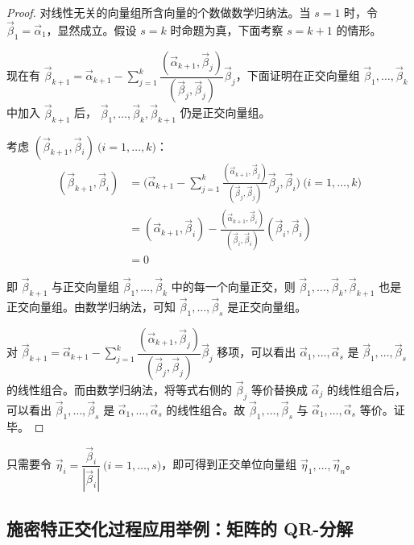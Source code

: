 \begin{proof}
	对线性无关的向量组所含向量的个数做数学归纳法。当 $s = 1$ 时，令 $\vec \beta_1 = \vec \alpha_1$，显然成立。假设 $s = k$ 时命题为真，下面考察 $s = k + 1$ 的情形。

	现在有 $\vec \beta_{k + 1} = \vec \alpha_{k + 1} - \sum\limits_{j = 1}^{k} \dfrac{(\vec \alpha_{k + 1}, \vec \beta_j)}{(\vec \beta_j, \vec \beta_j)} \vec \beta_j$，下面证明在正交向量组 $\vec \beta_1, \ldots, \vec \beta_k$ 中加入 $\vec \beta_{k + 1}$ 后， $\vec \beta_1, \ldots, \vec \beta_k, \vec \beta_{k + 1}$ 仍是正交向量组。

	考虑 $(\vec \beta_{k + 1}, \vec \beta_i) \pod{i = 1, \ldots, k}$：
	$$
	\begin{aligned}
		(\vec \beta_{k + 1}, \vec \beta_i) &= \biggl( \vec \alpha_{k + 1} - \sum\limits_{j = 1}^{k} \frac{(\vec \alpha_{k + 1}, \vec \beta_j)}{(\vec \beta_j, \vec \beta_j)} \vec \beta_j, \vec \beta_i \biggr) \pod{i = 1, \ldots, k}
		\\&=
		(\vec \alpha_{k + 1}, \vec \beta_i) - \frac{(\vec \alpha_{k + 1}, \vec \beta_i)}{(\vec \beta_i, \vec \beta_i)} (\vec \beta_i, \vec \beta_i)
		\\&=
		0
	\end{aligned}
	$$

	即 $\vec \beta_{k + 1}$ 与正交向量组 $\vec \beta_1, \ldots, \vec \beta_k$ 中的每一个向量正交，则 $\vec \beta_1, \ldots, \vec \beta_k, \vec \beta_{k + 1}$ 也是正交向量组。由数学归纳法，可知 $\vec \beta_1, \ldots, \vec \beta_s$ 是正交向量组。

	对 $\vec \beta_{k + 1} = \vec \alpha_{k + 1} - \sum\limits_{j = 1}^{k} \dfrac{(\vec \alpha_{k + 1}, \vec \beta_j)}{(\vec \beta_j, \vec \beta_j)} \vec \beta_j$ 移项，可以看出 $\vec \alpha_1, \ldots, \vec \alpha_s$ 是 $\vec \beta_1, \ldots, \vec \beta_s$ 的线性组合。而由数学归纳法，将等式右侧的 $\vec \beta_j$ 等价替换成 $\vec \alpha_j$ 的线性组合后，可以看出 $\vec \beta_1, \ldots, \vec \beta_s$ 是 $\vec \alpha_1, \ldots, \vec \alpha_s$ 的线性组合。故 $\vec \beta_1, \ldots, \vec \beta_s$ 与 $\vec \alpha_1, \ldots, \vec \alpha_s$ 等价。证毕。
\end{proof}

只需要令 $\vec \eta_i = \dfrac{\vec \beta_i}{|\vec \beta_i|} \pod{i = 1, \ldots, s}$，即可得到正交单位向量组 $\vec \eta_1, \ldots, \vec \eta_n$。

\subsection{施密特正交化过程应用举例：矩阵的 QR-分解}

